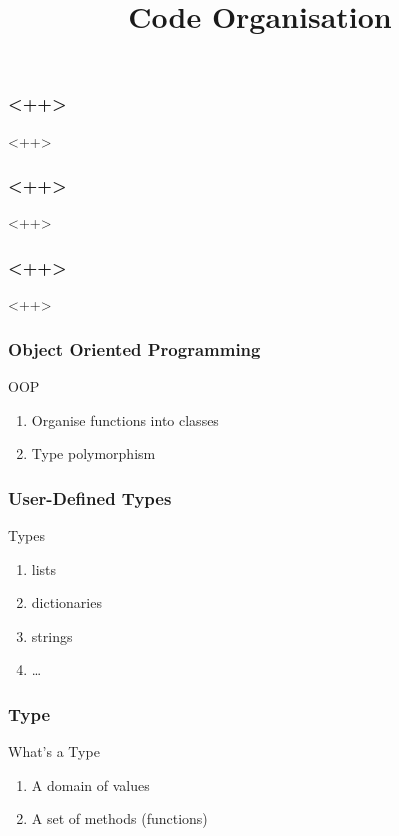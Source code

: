 
\title{Code Organisation}


\begin{frame}[fragile] 
\frametitle{<++>}
<++>
\end{frame}
\begin{frame}[fragile] 
\frametitle{<++>}
<++>
\end{frame}
\begin{frame}[fragile] 
\frametitle{<++>}
<++>
\end{frame}
\begin{frame}[fragile] 
\frametitle{Object Oriented Programming}

\begin{block}{OOP}
\begin{enumerate}
\item Organise functions into classes
\item Type polymorphism
\end{enumerate}
\end{block}
\end{frame}

\begin{frame}[fragile] 
\frametitle{User-Defined Types}

\begin{block}{Types}
\begin{enumerate}
\item lists
\item dictionaries
\item strings
\item \ldots
\end{enumerate}
\end{block}
\end{frame}

\begin{frame}[fragile] 
\frametitle{Type}
\begin{block}{What's a Type}
\begin{enumerate}
\item A domain of values
\item A set of methods (functions)
\end{enumerate}
\end{block}

\end{frame}

